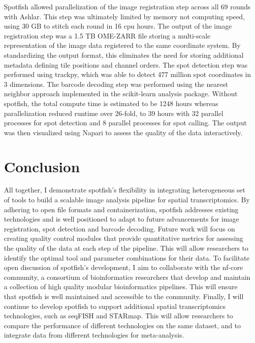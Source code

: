 Spotfish allowed parallelization of the image registration step across all 69 rounds with Ashlar. This step was ultimately limited by memory not computing speed, using 30 GB to stitch each round in 16 cpu hours. The output of the image registration step was a 1.5 TB OME-ZARR file storing a multi-scale representation of the image data registered to the same coordinate system.  By standardizing the output format, this eliminates the need for storing additional metadata defining tile positions and channel orders. The spot detection step was performed using trackpy, which was able to detect 477 million spot coordinates in 3 dimensions. The barcode decoding step was performed using the nearest neighbor approach implemented in the scikit-learn analysis package.  Without spotfish, the total compute time is estimated to be 1248 hours whereas parallelization reduced runtime over 26-fold, to 39 hours with 32 parallel processes for spot detection and 8 parallel processes for spot calling. The output was then visualized using Napari\cite{NapariMultidimensionalImage} to assess the quality of the data interactively.

\section{Conclusion}

All together, I demonstrate spotfish's flexibility in integrating heterogeneous set of tools to build a scalable image analysis pipeline for spatial transcriptomics. By adhering to open file formats and containerization, spotfish addresses existing technologies and is well positioned to adapt to future advancements for image registration, spot detection and barcode decoding. Future work will focus on creating quality control modules that provide quantitative metrics for assessing the quality of the data at each step of the pipeline. This will allow researchers to identify the optimal tool and parameter combinations for their data. To facilitate open discussion of spotfish's development, I aim to collaborate with the nf-core community, a consortium of bioinformatics researchers that develop and maintain a collection of high quality modular bioinformatics pipelines. This will ensure that spotfish is well maintained and accessible to the community. Finally, I will continue to develop spotfish to support additional spatial transcriptomics technologies, such as seqFISH and STARmap. This will allow researchers to compare the performance of different technologies on the same dataset, and to integrate data from different technologies for meta-analysis.